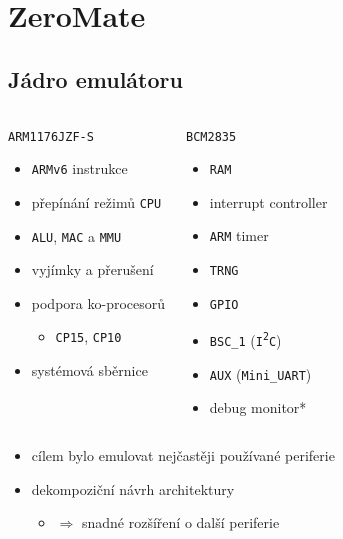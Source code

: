 \documentclass[compress]{beamer}
\begin{document}
\section{ZeroMate}

\subsection{Jádro emulátoru}

\begin{frame}
	\begin{columns}
		\begin{block}{\texttt{ARM1176JZF-S}}
			\begin{itemize}
				\item \texttt{ARMv6} instrukce
				\item přepínání režimů \texttt{CPU}
				\item \texttt{ALU}, \texttt{MAC} a \texttt{MMU}
				\item vyjímky a přerušení
				\item podpora ko-procesorů
				\begin{itemize}
					\item \texttt{CP15}, \texttt{CP10}
				\end{itemize}
				\item systémová sběrnice
			\end{itemize}
		\end{block}
		\begin{block}{\texttt{BCM2835}}
			\begin{itemize}
				\item \texttt{RAM}
				\item interrupt controller
				\item \texttt{ARM} timer
				\item \texttt{TRNG}
				\item \texttt{GPIO}
				\item \texttt{BSC\_1} (\texttt{I\textsuperscript{2}C})
				\item \texttt{AUX} (\texttt{Mini\_UART})
				\item debug monitor* 
			\end{itemize}
		\end{block}
	\end{columns}
	\vspace{0.4cm}
	\noindent\makebox[\linewidth]{\rule{\textwidth}{0.4pt}}
	\vspace{-0.4cm}
	\begin{itemize}
		\item cílem bylo emulovat nejčastěji používané periferie
		\item dekompoziční návrh architektury 
		\begin{itemize}
			\item $\Rightarrow$ snadné rozšíření o další periferie
		\end{itemize}
	\end{itemize}
\end{frame}
\end{document}
